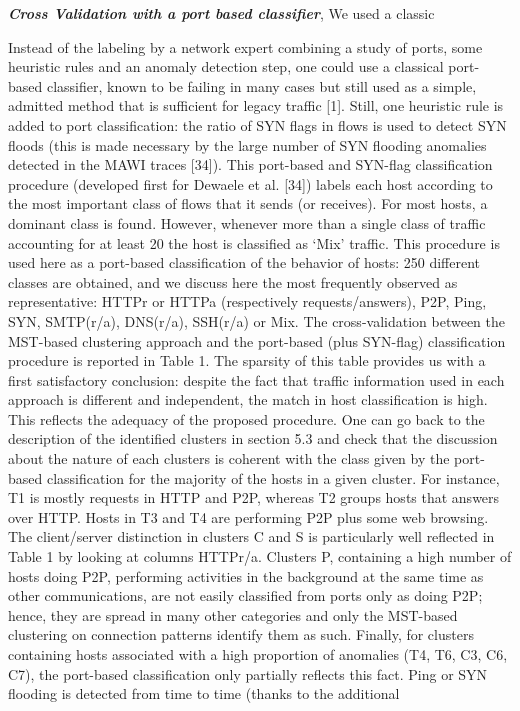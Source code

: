 \textbf{\textit{Cross Validation with a port based classifier}}, We used a classic 

Instead of the labeling by a network expert combining a study of ports, some heuristic rules and an
anomaly detection step, one could use a classical port-based classifier, known to be failing in many
cases but still used as a simple, admitted method that is sufficient for legacy traffic [1]. Still, one
heuristic rule is added to port classification: the ratio of SYN flags in flows is used to detect SYN floods
(this is made necessary by the large number of SYN flooding anomalies detected in the MAWI traces
[34]). This port-based and SYN-flag classification procedure (developed first for Dewaele et al. [34])
labels each host according to the most important class of flows that it sends (or receives). For most
hosts, a dominant class is found. However, whenever more than a single class of traffic accounting for
at least 20%
the host is classified as ‘Mix’ traffic. This procedure is used here as a port-based classification of the
behavior of hosts: 250 different classes are obtained, and we discuss here the most frequently observed
as representative: HTTPr or HTTPa (respectively requests/answers), P2P, Ping, SYN, SMTP(r/a),
DNS(r/a), SSH(r/a) or Mix.
The cross-validation between the MST-based clustering approach and the port-based (plus SYN-flag)
classification procedure is reported in Table 1. The sparsity of this table provides us with a first
satisfactory conclusion: despite the fact that traffic information used in each approach is different and
independent, the match in host classification is high. This reflects the adequacy of the proposed
procedure. One can go back to the description of the identified clusters in section 5.3 and check that
the discussion about the nature of each clusters is coherent with the class given by the port-based
classification for the majority of the hosts in a given cluster. For instance, T1 is mostly requests in HTTP
and P2P, whereas T2 groups hosts that answers over HTTP. Hosts in T3 and T4 are performing P2P plus
some web browsing. The client/server distinction in clusters C and S is particularly well reflected in
Table 1 by looking at columns HTTPr/a. Clusters P, containing a high number of hosts doing P2P,
performing activities in the background at the same time as other communications, are not easily
classified from ports only as doing P2P; hence, they are spread in many other categories and only the
MST-based clustering on connection patterns identify them as such. Finally, for clusters containing hosts
associated with a high proportion of anomalies (T4, T6, C3, C6, C7), the port-based classification only
partially reflects this fact. Ping or SYN flooding is detected from time to time (thanks to the additional




